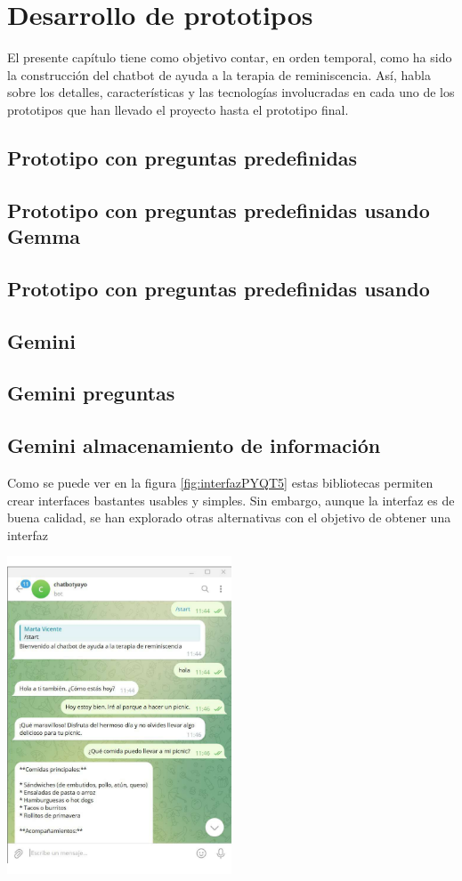 \chapter{Desarrollo de prototipos}
\label{cap:Desarrollo de prototipos}
El presente capítulo tiene como objetivo contar, en orden temporal, como ha sido la construcción del chatbot de ayuda a la terapia de reminiscencia. Así, habla sobre los detalles, características y las tecnologías involucradas en cada uno de los prototipos que han llevado el proyecto hasta el prototipo final. 

\section{Prototipo con preguntas predefinidas}
\section{Prototipo con preguntas predefinidas usando Gemma}
\section{Prototipo con preguntas predefinidas usando}
\section{Gemini}
\section{Gemini preguntas}
\section{Gemini almacenamiento de información}
Como se puede ver en la figura \ref{fig:interfazPYQT5} estas bibliotecas permiten crear interfaces bastantes usables y simples. Sin embargo, aunque la interfaz es de buena calidad, se han explorado otras alternativas con el objetivo de obtener una interfaz 

\includegraphics[width=0.5\textwidth]{Imagenes/telegram1}

